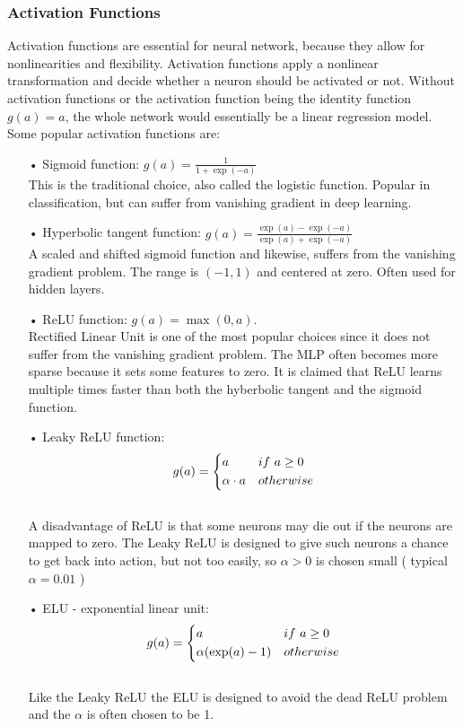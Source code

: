 \subsubsection{Activation Functions}
Activation functions are essential for neural network, because they allow for nonlinearities and flexibility. Activation functions apply a nonlinear transformation and decide whether a neuron should be activated or not. Without activation functions or the activation function being the identity function $g(a)=a$, the whole network would essentially be a linear regression model. Some popular activation functions are:
\begin{enumerate}
\item[•] Sigmoid function: $g(a)=\frac{1}{1+\exp(-a)}$\\

This is the traditional choice, also called the logistic function. Popular in classification, but can suffer from vanishing gradient in deep learning.
\item[•] Hyperbolic tangent function: $g(a)=\frac{\exp(a)-\exp(-a)}{\exp(a)+\exp(-a)}$\\

A scaled and shifted sigmoid function and likewise, suffers from the vanishing gradient problem. The range is $(-1,1)$ and centered at zero. Often used for hidden layers.
\item[•] ReLU function: $g(a)=\max(0,a)$.\\

Rectified Linear Unit is one of the most popular choices since it does not suffer from the vanishing gradient problem. The MLP often becomes more sparse because it sets some features to zero. It is claimed that ReLU learns multiple times faster than both the hyberbolic tangent and the sigmoid function.
\item[•] Leaky ReLU function:  \[ g(a)=
    \begin{dcases}
        a & if \ a \geq 0 \\
        \alpha \cdot a & otherwise \\
    \end{dcases}
\]\\
A disadvantage of ReLU is that some neurons may die out if the neurons are mapped to zero. The Leaky ReLU is designed to give such neurons a chance to get back into action, but not too easily, so $\alpha>0$ is chosen small ( typical $\alpha=0.01$ ) 

\item[•] ELU - exponential linear unit:  \[ g(a)=
    \begin{dcases}
        a & if \ a \geq 0 \\
        \alpha(\exp(a)-1) & otherwise \\
    \end{dcases}
\]\\
Like the Leaky ReLU the ELU is designed to avoid the dead ReLU problem and the $\alpha$ is often chosen to be 1. 
\end{enumerate}

